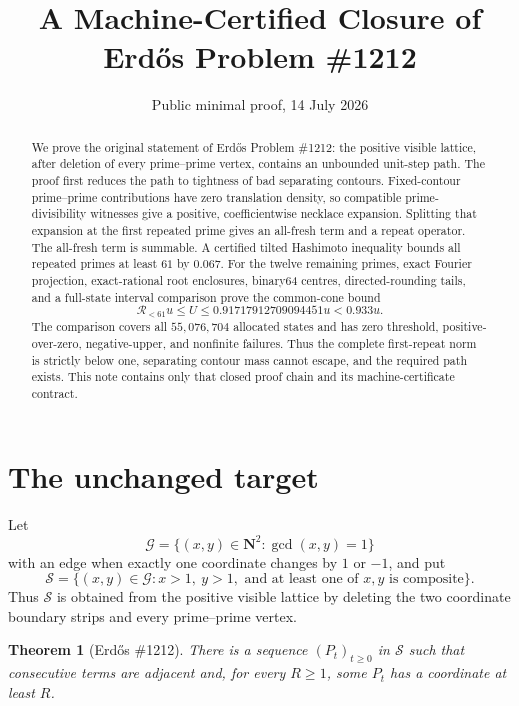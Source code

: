 \documentclass[11pt]{article}
\title{A Machine-Certified Closure of Erd\H{o}s Problem \#1212}
\author{}
\date{Public minimal proof, 14 July 2026}
\newtheorem{theorem}{Theorem}[section]
\theoremstyle{definition}
\theoremstyle{remark}
\newcommand{\N}{\mathbf N}
\newcommand{\cS}{\mathcal S}
\newcommand{\cG}{\mathcal G}
\begin{document}
\maketitle

\begin{abstract}
We prove the original statement of Erd\H{o}s Problem \#1212: the positive
visible lattice, after deletion of every prime--prime vertex, contains an
unbounded unit-step path.  The proof first reduces the path to tightness of
bad separating contours.  Fixed-contour prime--prime contributions have zero
translation density, so compatible prime-divisibility witnesses give a
positive, coefficientwise necklace expansion.  Splitting that expansion at
the first repeated prime gives an all-fresh term and a repeat operator.  The
all-fresh term is summable.  A certified tilted Hashimoto inequality bounds
all repeated primes at least $61$ by $0.067$.  For the twelve remaining
primes, exact Fourier projection, exact-rational root enclosures, binary64
centres, directed-rounding tails, and a full-state interval comparison prove
the common-cone bound
\[
 \mathcal R_{<61}u\leq U
 \leq0.91717912709094451u<0.933u.
\]
The comparison covers all $55{,}076{,}704$ allocated states and has zero
threshold, positive-over-zero, negative-upper, and nonfinite failures.  Thus
the complete first-repeat norm is strictly below one, separating contour mass
cannot escape, and the required path exists.  This note contains only that
closed proof chain and its machine-certificate contract.
\end{abstract}

\section{The unchanged target}

Let
\[
 \cG=\{(x,y)\in\N^2:\gcd(x,y)=1\}
\]
with an edge when exactly one coordinate changes by $1$ or $-1$, and put
\[
 \cS=\{(x,y)\in\cG:x>1,\ y>1,
       \text{ and at least one of $x,y$ is composite}\}.
\]
Thus $\cS$ is obtained from the positive visible lattice by deleting the two
coordinate boundary strips and every prime--prime vertex.

\begin{theorem}[Erd\H{o}s \#1212]
\label{thm:main-target}
There is a sequence $(P_t)_{t\geq0}$ in $\cS$ such that consecutive terms are
adjacent and, for every $R\geq1$, some $P_t$ has a coordinate at least $R$.
\end{theorem}
\end{document}
